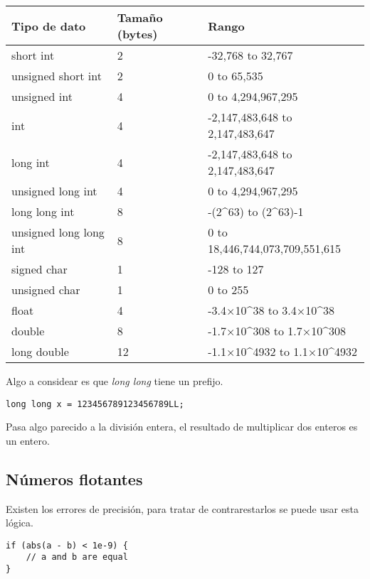 \documentclass[10pt]{article}
\begin{document}
\begin{center}
    \begin{tabular}{ |l|l|l| }
         \hline
         Tipo de dato & Tamaño (bytes) & Rango \\
         \hline
         short int & 2 & -32,768 to 32,767 \\
         unsigned short int & 2 & 0 to 65,535 \\
         unsigned int & 4 & 0 to 4,294,967,295 \\
         int & 4 & -2,147,483,648 to 2,147,483,647 \\
         long int & 4 & -2,147,483,648 to 2,147,483,647 \\
         unsigned long int & 4 & 0 to 4,294,967,295 \\
         long long int & 8 & -(2\textasciicircum63) to (2\textasciicircum63)-1 \\
         unsigned long long int  & 8 & 0 to 18,446,744,073,709,551,615 \\
         signed char & 1 & -128 to 127 \\
         unsigned char & 1 & 0 to 255 \\
         float & 4 & -3.4×10\textasciicircum38 to 3.4×10\textasciicircum38 \\
         double & 8 & -1.7×10\textasciicircum308 to 1.7×10\textasciicircum308 \\
         long double & 12 & -1.1×10\textasciicircum4932 to 1.1×10\textasciicircum4932 \\
         \hline
    \end{tabular}
\end{center}

Algo a considear es que \textit{long long} tiene un prefijo.

\begin{lstlisting}
long long x = 123456789123456789LL;
\end{lstlisting}

Pasa algo parecido a la división entera, el resultado de multiplicar dos enteros es un entero. 

\subsection{Números flotantes}

Existen los errores de precisión, para tratar de contrarestarlos se puede usar esta lógica.
\begin{lstlisting}
if (abs(a - b) < 1e-9) {
    // a and b are equal
}
\end{lstlisting}
\end{document}
